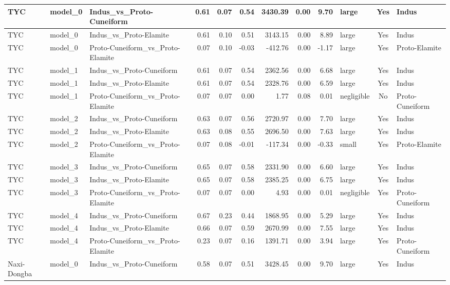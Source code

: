 \documentclass[11pt,a4paper,oneside]{report}
\begin{document}
\begin{landscape}
\begin{scriptsize}
\begin{longtable}{|l|l|l|r|r|r|r|r|r|l|c|l|}
TYC & model\_0 & Indus\_vs\_Proto-Cuneiform & 0.61 & 0.07 & 0.54 & 3430.39 & 0.00 & 9.70 & large & Yes & Indus \\ \hline
TYC & model\_0 & Indus\_vs\_Proto-Elamite & 0.61 & 0.10 & 0.51 & 3143.15 & 0.00 & 8.89 & large & Yes & Indus \\ \hline
TYC & model\_0 & Proto-Cuneiform\_vs\_Proto-Elamite & 0.07 & 0.10 & -0.03 & -412.76 & 0.00 & -1.17 & large & Yes & Proto-Elamite \\ \hline
TYC & model\_1 & Indus\_vs\_Proto-Cuneiform & 0.61 & 0.07 & 0.54 & 2362.56 & 0.00 & 6.68 & large & Yes & Indus \\ \hline
TYC & model\_1 & Indus\_vs\_Proto-Elamite & 0.61 & 0.07 & 0.54 & 2328.76 & 0.00 & 6.59 & large & Yes & Indus \\ \hline
TYC & model\_1 & Proto-Cuneiform\_vs\_Proto-Elamite & 0.07 & 0.07 & 0.00 & 1.77 & 0.08 & 0.01 & negligible & No & Proto-Cuneiform \\ \hline
TYC & model\_2 & Indus\_vs\_Proto-Cuneiform & 0.63 & 0.07 & 0.56 & 2720.97 & 0.00 & 7.70 & large & Yes & Indus \\ \hline
TYC & model\_2 & Indus\_vs\_Proto-Elamite & 0.63 & 0.08 & 0.55 & 2696.50 & 0.00 & 7.63 & large & Yes & Indus \\ \hline
TYC & model\_2 & Proto-Cuneiform\_vs\_Proto-Elamite & 0.07 & 0.08 & -0.01 & -117.34 & 0.00 & -0.33 & small & Yes & Proto-Elamite \\ \hline
TYC & model\_3 & Indus\_vs\_Proto-Cuneiform & 0.65 & 0.07 & 0.58 & 2331.90 & 0.00 & 6.60 & large & Yes & Indus \\ \hline
TYC & model\_3 & Indus\_vs\_Proto-Elamite & 0.65 & 0.07 & 0.58 & 2385.25 & 0.00 & 6.75 & large & Yes & Indus \\ \hline
TYC & model\_3 & Proto-Cuneiform\_vs\_Proto-Elamite & 0.07 & 0.07 & 0.00 & 4.93 & 0.00 & 0.01 & negligible & Yes & Proto-Cuneiform \\ \hline
TYC & model\_4 & Indus\_vs\_Proto-Cuneiform & 0.67 & 0.23 & 0.44 & 1868.95 & 0.00 & 5.29 & large & Yes & Indus \\ \hline
TYC & model\_4 & Indus\_vs\_Proto-Elamite & 0.66 & 0.07 & 0.59 & 2670.99 & 0.00 & 7.55 & large & Yes & Indus \\ \hline
TYC & model\_4 & Proto-Cuneiform\_vs\_Proto-Elamite & 0.23 & 0.07 & 0.16 & 1391.71 & 0.00 & 3.94 & large & Yes & Proto-Cuneiform \\ \hline
Naxi-Dongba & model\_0 & Indus\_vs\_Proto-Cuneiform & 0.58 & 0.07 & 0.51 & 3428.45 & 0.00 & 9.70 & large & Yes & Indus \\ \hline

\end{longtable}
\end{scriptsize}
\end{landscape}
\end{document}
